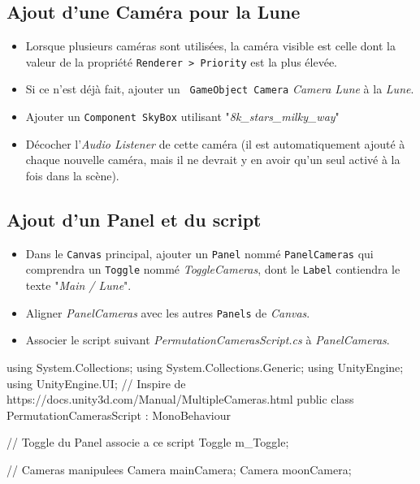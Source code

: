 \documentclass[a4paper,10pt]{article}
\newenvironment{solution}%
{\begin{tcolorbox}[breakable,colback=red!5!white,colframe=red!75!black,title=Solution]}%
{\end{tcolorbox}}
\newenvironment{boxcode}%
{\begin{tcolorbox}[breakable,colback=gray!5!white,colframe=black]}%
	{\end{tcolorbox}}
\begin{document}
\ifversionenseignant
\begin{solution}
\subsection{Ajout d'une Caméra pour la Lune}

\begin{itemize}
	\item Lorsque plusieurs caméras sont utilisées, la caméra visible est celle dont la valeur de la propriété \texttt{Renderer > Priority} est la plus élevée.
	\item Si ce n'est déjà fait, ajouter un \texttt{ GameObject Camera} \textit{Camera Lune} à la \textit{Lune}.
	\item Ajouter un \texttt{Component SkyBox} utilisant "\textit{8k\_stars\_milky\_way}"
	\item Décocher l'\textit{Audio Listener} de cette caméra (il est automatiquement ajouté à chaque nouvelle caméra, mais il ne devrait y en avoir qu'un seul activé à la fois dans la scène).
\end{itemize}	

	
\subsection{Ajout d'un Panel et du script}
\begin{itemize}
	\item Dans le \texttt{Canvas} principal, ajouter un \texttt{Panel} nommé \texttt{PanelCameras} qui comprendra un \texttt{Toggle} nommé \textit{ToggleCameras}, dont le \texttt{Label} contiendra le texte "\textit{Main / Lune}".
	\item Aligner \textit{PanelCameras} avec les autres \texttt{Panels} de \textit{Canvas}.
	\item Associer le script suivant \textit{PermutationCamerasScript.cs} à \textit{PanelCameras}.
\end{itemize}	

\begin{boxcode}
	\begin{csharpsansbord}
using System.Collections;
using System.Collections.Generic;
using UnityEngine;
using UnityEngine.UI;
// Inspire de https://docs.unity3d.com/Manual/MultipleCameras.html
public class PermutationCamerasScript : MonoBehaviour
{
	// Toggle du Panel associe a ce script
	Toggle m_Toggle;
	
	// Cameras manipulees
	Camera mainCamera;
	Camera moonCamera;
	
}
\end{csharpsansbord}
\end{boxcode}
\end{solution}
\end{document}

